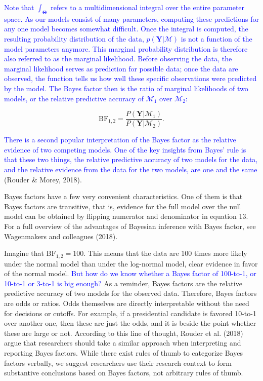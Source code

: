 \documentclass[
  english,
  doc,floatsintext]{apa6}
\begin{document}
\textcolor{blue}{Note that $\int_{\bm{\Theta}}$ refers to a multidimensional integral over the entire parameter space. As our models consist of many parameters, computing these predictions for any one model becomes somewhat difficult. Once the integral is computed, the resulting probability distribution of the data, $p(\bm{Y} | \mathcal{M})$ is not a function of the model parameters anymore. This marginal probability distribution is therefore also referred to as the marginal likelihood. Before observing the data, the marginal likelihood serves as prediction for possible data; once the data are observed, the function tells us how well these specific observations were predicted by the model. The Bayes factor then is the ratio of marginal likelihoods of two models, or the relative predictive accuracy of $\mathcal{M}_1$ over $\mathcal{M}_2$:}

\begin{equation}
\text{BF}_{1,2} = \frac{P(\bm{Y} | \mathcal{M}_1)}{P(\bm{Y} | \mathcal{M}_2)}. 
\end{equation}

\textcolor{blue}{There is a second popular interpretation of the Bayes factor as the relative evidence of two competing models. One of the key insights from Bayes' rule is that these two things, the relative predictive accuracy of two models for the data, and the relative evidence from the data for the two models, are one and the same} (Rouder \& Morey, 2018).

Bayes factors have a few very convenient characteristics. One of them is that Bayes factors are transitive, that is, evidence for the full model over the null model can be obtained by flipping numerator and denominator in equation 13. For a full overview of the advantages of Bayesian inference with Bayes factor, see Wagenmakers and colleagues (2018).

Imagine that \(\text{BF}_{1,2} = 100\). This means that the data are 100 times more likely under the normal model than under the log-normal model, clear evidence in favor of the normal model. \textcolor{blue}{But how do we know whether a Bayes factor of 100-to-1, or 10-to-1 or 3-to-1 is big enough?} As a reminder, Bayes factors are the relative predictive accuracy of two models for the observed data. Therefore, Bayes factors are odds or ratios. Odds themselves are directly interpretable without the need for decisions or cutoffs. For example, if a presidential candidate is favored 10-to-1 over another one, then these are just the odds, and it is beside the point whether these are large or not. According to this line of thought, Rouder et al. (2018) argue that researchers should take a similar approach when interpreting and reporting Bayes factors. While there exist rules of thumb to categorize Bayes factors verbally, we suggest researchers use their research context to form substantive conclusions based on Bayes factors, not arbitrary rules of thumb.
\end{document}
